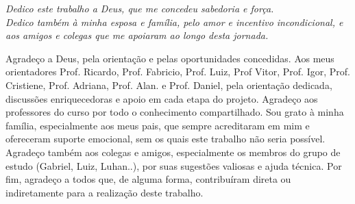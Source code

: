 \documentclass[12pt, openright, oneside, a4paper, brazil]{ads-unipac-abntex2}
\begin{document}
 
\frenchspacing 

\imprimircapa
\imprimirfolhaderosto

\begin{dedicatoria}
  \vspace*{\fill}
  \centering
  \noindent
  \textit{Dedico este trabalho a Deus, que me concedeu sabedoria e força. \\
  Dedico também à minha  esposa e família, pelo amor e incentivo incondicional, e aos amigos e colegas que me apoiaram ao longo desta jornada.}
  \vspace*{\fill}
\end{dedicatoria}

\begin{agradecimentos}
\noindent
Agradeço a Deus, pela orientação e pelas oportunidades concedidas. Aos meus orientadores Prof. Ricardo, Prof. Fabricio, Prof. Luiz, Prof Vitor, Prof. Igor, Prof. Cristiene, Prof. Adriana, Prof. Alan. e Prof. Daniel, pela orientação dedicada, discussões enriquecedoras e apoio em cada etapa do projeto. Agradeço aos professores do curso por todo o conhecimento compartilhado. Sou grato à minha família, especialmente aos meus pais, que sempre acreditaram em mim e ofereceram suporte emocional, sem os quais este trabalho não seria possível. Agradeço também aos colegas e amigos, especialmente os membros do grupo de estudo (Gabriel, Luiz, Luhan..), por suas sugestões valiosas e ajuda técnica. Por fim, agradeço a todos que, de alguma forma, contribuíram direta ou indiretamente para a realização deste trabalho.
\end{agradecimentos}
\end{document}
